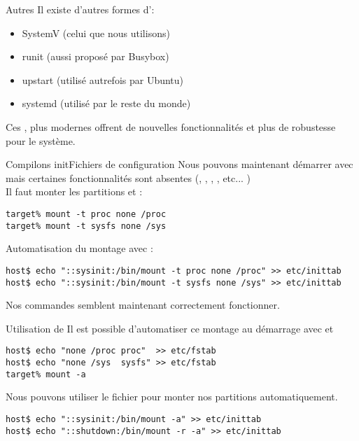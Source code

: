 \begin{frame}[fragile=singleslide]{Autres }
  Il existe d'autres formes d':
  \begin{itemize}
  \item SystemV (celui que nous utilisons)
  \item runit (aussi proposé par Busybox)
  \item upstart (utilisé autrefois par Ubuntu)
  \item systemd (utilisé par le reste du monde)
  \end{itemize}
  Ces ,  plus modernes  offrent de nouvelles  fonctionnalités et
  plus de robustesse pour le système.
\end{frame}

\begin{frame}[fragile=singleslide]{Compilons init}{Fichiers de configuration}
  Nous  pouvons  maintenant  démarrer avec    mais
  certaines fonctionnalités sont absentes (, ,
  , , etc... )\\
  Il faut monter les partitions  et :
  \begin{lstlisting}
target% mount -t proc none /proc
target% mount -t sysfs none /sys
  \end{lstlisting}
  Automatisation du montage avec :
  \begin{lstlisting}
host$ echo "::sysinit:/bin/mount -t proc none /proc" >> etc/inittab
host$ echo "::sysinit:/bin/mount -t sysfs none /sys" >> etc/inittab
  \end{lstlisting}
  Nos commandes semblent maintenant correctement fonctionner.
\end{frame}

\begin{frame}[fragile=singleslide]{Utilisation de }
  Il  est   possible  d'automatiser  ce  montage   au  démarrage  avec
   et 
  \begin{lstlisting}
host$ echo "none /proc proc"  >> etc/fstab
host$ echo "none /sys  sysfs" >> etc/fstab
target% mount -a
  \end{lstlisting}

  Nous pouvons utiliser le  fichier  pour monter nos
  partitions automatiquement.
  \begin{lstlisting}
host$ echo "::sysinit:/bin/mount -a" >> etc/inittab
host$ echo "::shutdown:/bin/mount -r -a" >> etc/inittab
  \end{lstlisting}
\end{frame}

